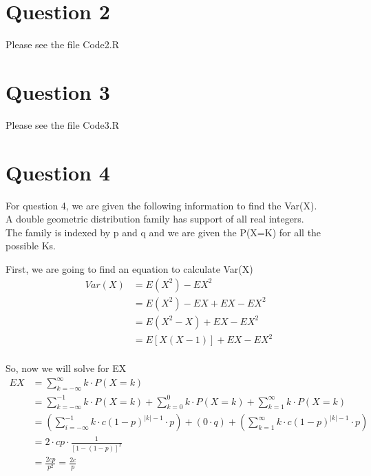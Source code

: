 \documentclass{article}
\numberwithin{equation}{section}
\newcommand{\eqname}[1]{\tag*{#1}}%
\begin{document}
\section{Question 2}

Please see the file Code2.R

\section{Question 3}

Please see the file Code3.R

\section{Question 4}

For question 4, we are given the following information to find the Var(X).
\\ \indent 
A double geometric distribution family has support of all real integers.
\\ \indent 
The family is indexed by p and q and we are given the P(X=K) for all the possible Ks.

First, we are going to find an equation to calculate Var(X) 
\begin{align} 
	    \label{Var(X) Derived}
		Var(X) &=  E(X^2) - EX^2 \eqname{} \\
		&= E(X^2) - EX + EX - EX^2 \eqname{- EX + EX = + 0} \\
		&= E(X^2 - X) + EX - EX^2 \eqname{Factored into EX} \\
		&= E[X(X-1)] + EX - EX^2 \eqname{Algebra} \\
\end{align}

So, now we will solve for EX
\begin{align} 
	    \label{EX}
		EX &=  \sum_{k = -\infty}^{\infty} k \cdot P(X=k) \eqname{} \\
		&= \sum_{k = -\infty}^{-1} k \cdot P(X=k) + \sum_{k = 0}^{0} k \cdot P(X=k) + \sum_{k = 1}^{\infty} k \cdot P(X=k) \eqname{} \\
		&= (\sum_{i = -\infty}^{-1} k\cdot c (1-p)^{|k|- 1} \cdot p) + (0 \cdot q) + (\sum_{k = 1}^{\infty} k\cdot c (1-p)^{|k|- 1} \cdot p) \eqname{} \\
		&= 2 \cdot cp \cdot \frac{1}{[1-(1-p)]^2} \eqname{} \\
		&= \frac{2cp}{p^2} = \frac{2c}{p} \eqname{} \\
\end{align}
\end{document}
